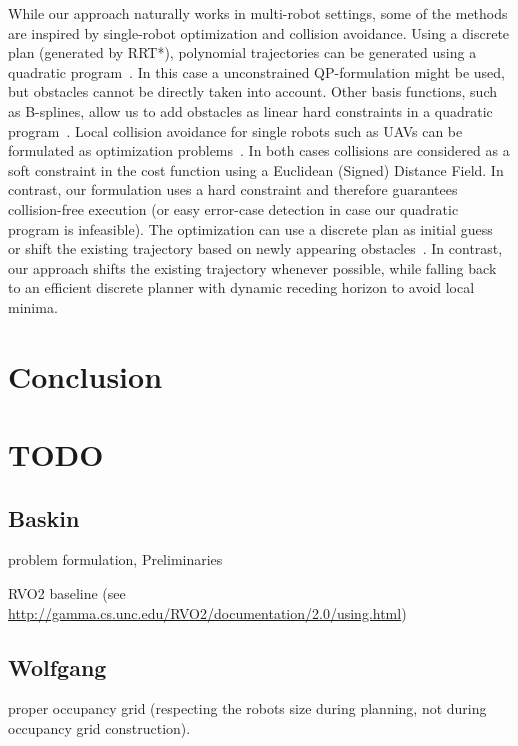 \documentclass{svproc}
\begin{document}
While our approach naturally works in multi-robot settings, some of the methods are inspired by single-robot optimization and collision avoidance.
Using a discrete plan (generated by RRT*), polynomial trajectories can be generated using a quadratic program~\cite{richterISRR}.
In this case a unconstrained QP-formulation might be used, but obstacles cannot be directly taken into account.
Other basis functions, such as B-splines, allow us to add obstacles as linear hard constraints in a quadratic program~\cite{flores,tang}.
Local collision avoidance for single robots such as UAVs can be formulated as optimization problems~\cite{replanning-eth,replanning-usenko}.
In both cases collisions are considered as a soft constraint in the cost function using a Euclidean (Signed) Distance Field.
In contrast, our formulation uses a hard constraint and therefore guarantees collision-free execution (or easy error-case detection in case our quadratic program is infeasible).
The optimization can use a discrete plan as initial guess~\cite{replanning-eth} or shift the existing trajectory based on newly appearing obstacles~\cite{replanning-usenko}.
In contrast, our approach shifts the existing trajectory whenever possible, while falling back to an efficient discrete planner with dynamic receding horizon to avoid local minima.








\section{Conclusion}

%
%



\section{TODO}

\subsection{Baskin}
problem formulation, Preliminaries

RVO2 baseline (see \url{http://gamma.cs.unc.edu/RVO2/documentation/2.0/using.html})

\subsection{Wolfgang}

proper occupancy grid (respecting the robots size during planning, not during occupancy grid construction).


% 
\end{document}
